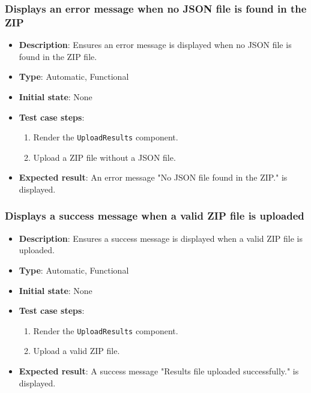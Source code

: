 \documentclass[12pt, titlepage]{article}
\begin{document}
\subsubsection{Displays an error message when no JSON file is found in the ZIP}
\begin{itemize}
    \item \textbf{Description}: Ensures an error message is displayed when no JSON file is found in the ZIP file.
    \item \textbf{Type}: Automatic, Functional
    \item \textbf{Initial state}: None
    \item \textbf{Test case steps}:
    \begin{enumerate}
        \item Render the \texttt{UploadResults} component.
        \item Upload a ZIP file without a JSON file.
    \end{enumerate}
    \item \textbf{Expected result}: An error message "No JSON file found in the ZIP." is displayed.
\end{itemize}

\subsubsection{Displays a success message when a valid ZIP file is uploaded}
\begin{itemize}
    \item \textbf{Description}: Ensures a success message is displayed when a valid ZIP file is uploaded.
    \item \textbf{Type}: Automatic, Functional
    \item \textbf{Initial state}: None
    \item \textbf{Test case steps}:
    \begin{enumerate}
        \item Render the \texttt{UploadResults} component.
        \item Upload a valid ZIP file.
    \end{enumerate}
    \item \textbf{Expected result}: A success message "Results file uploaded successfully." is displayed.
\end{itemize}
\end{document}
